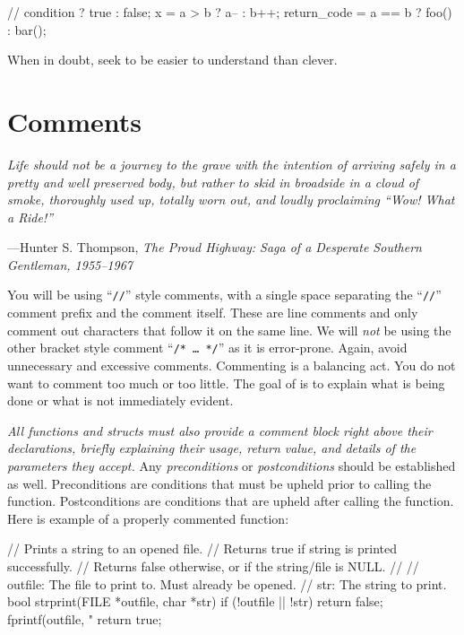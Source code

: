 \documentclass[11pt]{article}
\begin{document}
\begin{clisting}{}
// condition ? true : false;
x = a > b ? a-- : b++;
return_code = a == b ? foo() : bar();
\end{clisting}

When in doubt, seek to be easier to understand than clever.


\section{Comments}\label{blockcomments}

\textwidth
\epigraph{\emph{Life should not be a journey to the grave with the intention of arriving safely in a pretty and well preserved body, but rather to skid in broadside in a cloud of smoke, thoroughly used up, totally worn out, and loudly proclaiming ``Wow! What a Ride!''}}
{---Hunter S. Thompson, \emph{The Proud Highway: Saga of a Desperate Southern Gentleman, 1955--1967}}

\noindent You will be using ``\texttt{//}'' style comments, with a single space
separating the ``\texttt{//}'' comment prefix and the comment itself. These are
line comments and only comment out characters that follow it on the same line.
We will \emph{not} be using the other bracket style comment ``\texttt{/* \ldots
*/}'' as it is error-prone.  Again, avoid unnecessary and excessive comments.
Commenting is a balancing act.  You do not want to comment too much or too
little. The goal of is to explain what is being done or what is not immediately
evident.

\emph{All functions and structs must also provide a comment block right
above their declarations, briefly explaining their usage, return value,
and details of the parameters they accept.} Any \emph{preconditions} or
\emph{postconditions} should be established as well. Preconditions are
conditions that must be upheld prior to calling the function.
Postconditions are conditions that are upheld after calling the
function. Here is example of a properly commented function:

\begin{clisting}{}
// Prints a string to an opened file.
// Returns true if string is printed successfully.
// Returns false otherwise, or if the string/file is NULL.
//
// outfile: The file to print to. Must already be opened.
// str: The string to print.
bool strprint(FILE *outfile, char *str) {
  if (!outfile || !str) {
    return false;
  }
  fprintf(outfile, "%
  return true;
}
\end{clisting}
\end{document}
